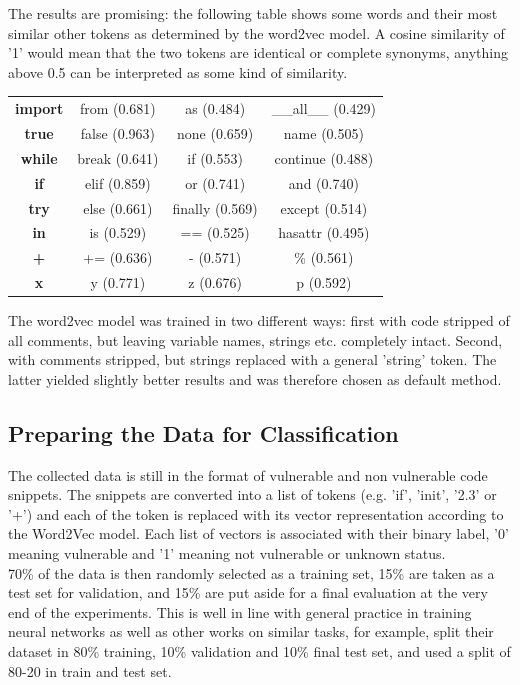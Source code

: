 \documentclass[
	a4paper,
	pagesize,
	pdftex,
	12pt,
	twoside, %
	BCOR=5mm, %
	ngerman,
	fleqn,
	final,
	]{scrartcl}
\begin{document}
The results are promising: the following table shows some words and their most similar other tokens as determined by the word2vec model. A cosine similarity of '1' would mean that the two tokens are identical or complete synonyms, anything above 0.5 can be interpreted as some kind of similarity. 

\begin{center}
	\begin{tabular}{ |c|c|c|c| } 
		\hline
		\textbf{import} & from (0.681) & as (0.484) & \_\_all\_\_ (0.429)\\ 
		\textbf{true} & false (0.963) & none (0.659) & name (0.505)\\  
		\textbf{while} & break (0.641)  & if (0.553) & continue (0.488) \\
		\textbf{if} & elif (0.859)  & or (0.741) & and (0.740) \\
		\textbf{try} & else (0.661)  & finally (0.569) & except (0.514) \\
		\textbf{in} & is (0.529)  & == (0.525) & hasattr (0.495) \\
		\textbf{+} & += (0.636)  & - (0.571) & \% (0.561) \\
		\textbf{x} & y (0.771)  & z (0.676) & p (0.592) \\

		\hline
	\end{tabular}
\end{center}

The word2vec model was trained in two different ways: first with code stripped of all comments, but leaving variable names, strings etc. completely intact. Second, with comments stripped, but strings replaced with a general 'string' token. The latter yielded slightly better results and was therefore chosen as default method.


\subsection{Preparing the Data for Classification}
The collected data is still in the format of vulnerable and non vulnerable code snippets. The snippets are converted into a list of tokens (e.g. 'if', 'init', '2.3' or '+') and each of the token is replaced with its vector representation according to the Word2Vec model. Each list of vectors is associated with their binary label, '0' meaning vulnerable and '1' meaning not vulnerable or unknown status.\\
70\% of the data is then randomly selected as a training set, 15\% are taken as a test set for validation, and 15\% are put aside for a final evaluation at the very end of the experiments. This is well in line with general practice in training neural networks as well as other works on similar tasks, for example, \cite{Russell.2018} split their dataset in 80\% training, 10\% validation and 10\% final test set, and \cite{Li.2018} used a split of 80-20 in train and test set. \\
\end{document}
